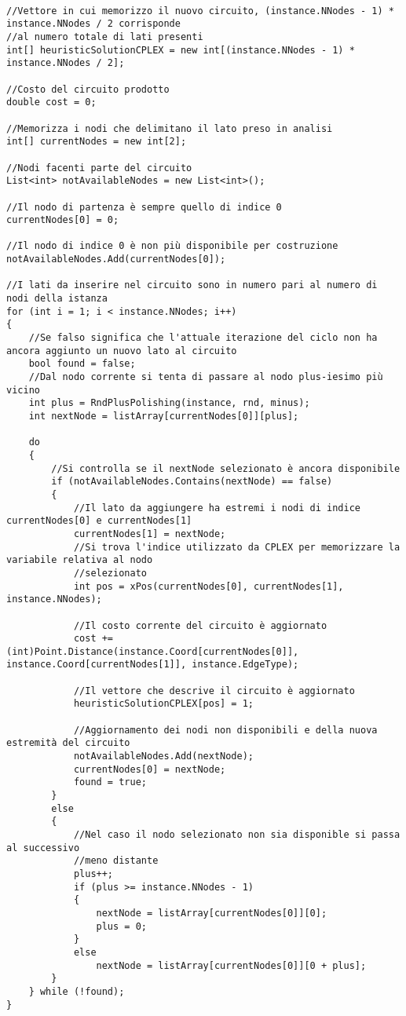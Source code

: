 \documentclass[11pt]{article}
\begin{document}
\begin{lstlisting}

//Vettore in cui memorizzo il nuovo circuito, (instance.NNodes - 1) * instance.NNodes / 2 corrisponde
//al numero totale di lati presenti
int[] heuristicSolutionCPLEX = new int[(instance.NNodes - 1) * instance.NNodes / 2];

//Costo del circuito prodotto
double cost = 0;

//Memorizza i nodi che delimitano il lato preso in analisi 
int[] currentNodes = new int[2];

//Nodi facenti parte del circuito
List<int> notAvailableNodes = new List<int>();

//Il nodo di partenza è sempre quello di indice 0
currentNodes[0] = 0;

//Il nodo di indice 0 è non più disponibile per costruzione
notAvailableNodes.Add(currentNodes[0]);

//I lati da inserire nel circuito sono in numero pari al numero di nodi della istanza
for (int i = 1; i < instance.NNodes; i++)
{
    //Se falso significa che l'attuale iterazione del ciclo non ha ancora aggiunto un nuovo lato al circuito
    bool found = false;
    //Dal nodo corrente si tenta di passare al nodo plus-iesimo più vicino
    int plus = RndPlusPolishing(instance, rnd, minus);
    int nextNode = listArray[currentNodes[0]][plus];

    do
    {
        //Si controlla se il nextNode selezionato è ancora disponibile
        if (notAvailableNodes.Contains(nextNode) == false)
        {
            //Il lato da aggiungere ha estremi i nodi di indice currentNodes[0] e currentNodes[1]
            currentNodes[1] = nextNode;
            //Si trova l'indice utilizzato da CPLEX per memorizzare la variabile relativa al nodo
            //selezionato
            int pos = xPos(currentNodes[0], currentNodes[1], instance.NNodes);

            //Il costo corrente del circuito è aggiornato
            cost += (int)Point.Distance(instance.Coord[currentNodes[0]], instance.Coord[currentNodes[1]], instance.EdgeType);

            //Il vettore che descrive il circuito è aggiornato
            heuristicSolutionCPLEX[pos] = 1;

            //Aggiornamento dei nodi non disponibili e della nuova estremità del circuito
            notAvailableNodes.Add(nextNode);
            currentNodes[0] = nextNode;
            found = true;
        }
        else
        {
            //Nel caso il nodo selezionato non sia disponible si passa al successivo
            //meno distante
            plus++;
            if (plus >= instance.NNodes - 1)
            {
                nextNode = listArray[currentNodes[0]][0];
                plus = 0;
            }
            else
                nextNode = listArray[currentNodes[0]][0 + plus];
        }
    } while (!found);
}


\end{lstlisting}
\end{document}
